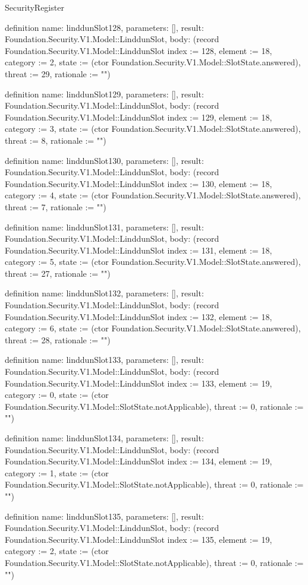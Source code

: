 \begin{lexlean}{SecurityRegister}
\begin{semanticmodule}
definition{
  name: linddunSlot128,
  parameters: [],
  result: Foundation.Security.V1.Model::LinddunSlot,
  body: (record Foundation.Security.V1.Model::LinddunSlot {index := 128, element := 18, category := 2, state := (ctor Foundation.Security.V1.Model::SlotState.answered), threat := 29, rationale := ""})
}

definition{
  name: linddunSlot129,
  parameters: [],
  result: Foundation.Security.V1.Model::LinddunSlot,
  body: (record Foundation.Security.V1.Model::LinddunSlot {index := 129, element := 18, category := 3, state := (ctor Foundation.Security.V1.Model::SlotState.answered), threat := 8, rationale := ""})
}

definition{
  name: linddunSlot130,
  parameters: [],
  result: Foundation.Security.V1.Model::LinddunSlot,
  body: (record Foundation.Security.V1.Model::LinddunSlot {index := 130, element := 18, category := 4, state := (ctor Foundation.Security.V1.Model::SlotState.answered), threat := 7, rationale := ""})
}

definition{
  name: linddunSlot131,
  parameters: [],
  result: Foundation.Security.V1.Model::LinddunSlot,
  body: (record Foundation.Security.V1.Model::LinddunSlot {index := 131, element := 18, category := 5, state := (ctor Foundation.Security.V1.Model::SlotState.answered), threat := 27, rationale := ""})
}

definition{
  name: linddunSlot132,
  parameters: [],
  result: Foundation.Security.V1.Model::LinddunSlot,
  body: (record Foundation.Security.V1.Model::LinddunSlot {index := 132, element := 18, category := 6, state := (ctor Foundation.Security.V1.Model::SlotState.answered), threat := 28, rationale := ""})
}

definition{
  name: linddunSlot133,
  parameters: [],
  result: Foundation.Security.V1.Model::LinddunSlot,
  body: (record Foundation.Security.V1.Model::LinddunSlot {index := 133, element := 19, category := 0, state := (ctor Foundation.Security.V1.Model::SlotState.notApplicable), threat := 0, rationale := ""})
}

definition{
  name: linddunSlot134,
  parameters: [],
  result: Foundation.Security.V1.Model::LinddunSlot,
  body: (record Foundation.Security.V1.Model::LinddunSlot {index := 134, element := 19, category := 1, state := (ctor Foundation.Security.V1.Model::SlotState.notApplicable), threat := 0, rationale := ""})
}

definition{
  name: linddunSlot135,
  parameters: [],
  result: Foundation.Security.V1.Model::LinddunSlot,
  body: (record Foundation.Security.V1.Model::LinddunSlot {index := 135, element := 19, category := 2, state := (ctor Foundation.Security.V1.Model::SlotState.notApplicable), threat := 0, rationale := ""})
}


\end{semanticmodule}
\end{lexlean}
